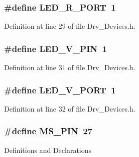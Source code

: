 \subsubsection[{\texorpdfstring{L\+E\+D\+\_\+\+R\+\_\+\+P\+O\+RT}{LED_R_PORT}}]{\setlength{\rightskip}{0pt plus 5cm}\#define L\+E\+D\+\_\+\+R\+\_\+\+P\+O\+RT~1}\hypertarget{group__Devices__Library_ga5a11a7cbc215e25401541277460113a4}{}\label{group__Devices__Library_ga5a11a7cbc215e25401541277460113a4}


Definition at line 29 of file Drv\+\_\+\+Devices.\+h.

\subsubsection[{\texorpdfstring{L\+E\+D\+\_\+\+V\+\_\+\+P\+IN}{LED_V_PIN}}]{\setlength{\rightskip}{0pt plus 5cm}\#define L\+E\+D\+\_\+\+V\+\_\+\+P\+IN~1}\hypertarget{group__Devices__Library_gaefaaa0f7c44f79a6150287630f9531d6}{}\label{group__Devices__Library_gaefaaa0f7c44f79a6150287630f9531d6}


Definition at line 31 of file Drv\+\_\+\+Devices.\+h.

\subsubsection[{\texorpdfstring{L\+E\+D\+\_\+\+V\+\_\+\+P\+O\+RT}{LED_V_PORT}}]{\setlength{\rightskip}{0pt plus 5cm}\#define L\+E\+D\+\_\+\+V\+\_\+\+P\+O\+RT~1}\hypertarget{group__Devices__Library_gab09c8e054071dd324e1527eadec02adf}{}\label{group__Devices__Library_gab09c8e054071dd324e1527eadec02adf}


Definition at line 32 of file Drv\+\_\+\+Devices.\+h.

\subsubsection[{\texorpdfstring{M\+S\+\_\+\+P\+IN}{MS_PIN}}]{\setlength{\rightskip}{0pt plus 5cm}\#define M\+S\+\_\+\+P\+IN~27}\hypertarget{group__Devices__Library_ga3ea9ecb7907af23b0d59637a7e778d47}{}\label{group__Devices__Library_ga3ea9ecb7907af23b0d59637a7e778d47}
Definitions and Declarations 

